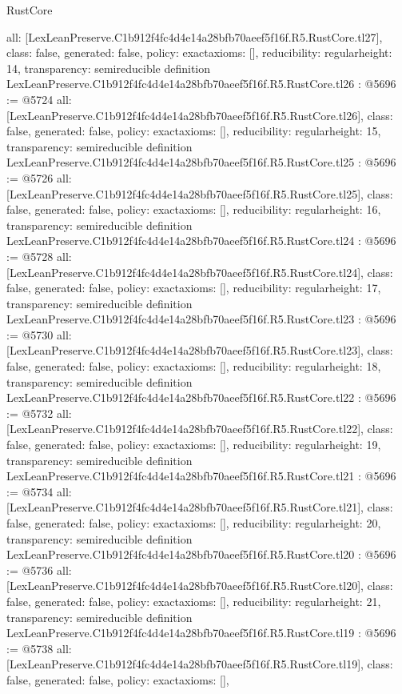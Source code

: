 \begin{lexlean}{RustCore}
\begin{coremodule}
{  all: [LexLeanPreserve.C1b912f4fc4d4e14a28bfb70aeef5f16f.R5.RustCore.tl27],
  class: false,
  generated: false,
  policy: exact{axioms: []},
  reducibility: regular{height: 14},
  transparency: semireducible
}
definition LexLeanPreserve.C1b912f4fc4d4e14a28bfb70aeef5f16f.R5.RustCore.tl26 : @5696 := @5724 {
  all: [LexLeanPreserve.C1b912f4fc4d4e14a28bfb70aeef5f16f.R5.RustCore.tl26],
  class: false,
  generated: false,
  policy: exact{axioms: []},
  reducibility: regular{height: 15},
  transparency: semireducible
}
definition LexLeanPreserve.C1b912f4fc4d4e14a28bfb70aeef5f16f.R5.RustCore.tl25 : @5696 := @5726 {
  all: [LexLeanPreserve.C1b912f4fc4d4e14a28bfb70aeef5f16f.R5.RustCore.tl25],
  class: false,
  generated: false,
  policy: exact{axioms: []},
  reducibility: regular{height: 16},
  transparency: semireducible
}
definition LexLeanPreserve.C1b912f4fc4d4e14a28bfb70aeef5f16f.R5.RustCore.tl24 : @5696 := @5728 {
  all: [LexLeanPreserve.C1b912f4fc4d4e14a28bfb70aeef5f16f.R5.RustCore.tl24],
  class: false,
  generated: false,
  policy: exact{axioms: []},
  reducibility: regular{height: 17},
  transparency: semireducible
}
definition LexLeanPreserve.C1b912f4fc4d4e14a28bfb70aeef5f16f.R5.RustCore.tl23 : @5696 := @5730 {
  all: [LexLeanPreserve.C1b912f4fc4d4e14a28bfb70aeef5f16f.R5.RustCore.tl23],
  class: false,
  generated: false,
  policy: exact{axioms: []},
  reducibility: regular{height: 18},
  transparency: semireducible
}
definition LexLeanPreserve.C1b912f4fc4d4e14a28bfb70aeef5f16f.R5.RustCore.tl22 : @5696 := @5732 {
  all: [LexLeanPreserve.C1b912f4fc4d4e14a28bfb70aeef5f16f.R5.RustCore.tl22],
  class: false,
  generated: false,
  policy: exact{axioms: []},
  reducibility: regular{height: 19},
  transparency: semireducible
}
definition LexLeanPreserve.C1b912f4fc4d4e14a28bfb70aeef5f16f.R5.RustCore.tl21 : @5696 := @5734 {
  all: [LexLeanPreserve.C1b912f4fc4d4e14a28bfb70aeef5f16f.R5.RustCore.tl21],
  class: false,
  generated: false,
  policy: exact{axioms: []},
  reducibility: regular{height: 20},
  transparency: semireducible
}
definition LexLeanPreserve.C1b912f4fc4d4e14a28bfb70aeef5f16f.R5.RustCore.tl20 : @5696 := @5736 {
  all: [LexLeanPreserve.C1b912f4fc4d4e14a28bfb70aeef5f16f.R5.RustCore.tl20],
  class: false,
  generated: false,
  policy: exact{axioms: []},
  reducibility: regular{height: 21},
  transparency: semireducible
}
definition LexLeanPreserve.C1b912f4fc4d4e14a28bfb70aeef5f16f.R5.RustCore.tl19 : @5696 := @5738 {
  all: [LexLeanPreserve.C1b912f4fc4d4e14a28bfb70aeef5f16f.R5.RustCore.tl19],
  class: false,
  generated: false,
  policy: exact{axioms: []},
}
\end{coremodule}
\end{lexlean}
